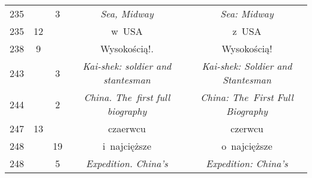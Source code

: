 \documentclass[a4paper,11pt]{article}
\numberwithin{equation}{section}
\begin{document}
\begin{center}
\begin{tabular}{|c|c|c|c|c|}
    235 & &  3 & \textit{Sea, Midway} & \textit{Sea: Midway} \\
    235 & 12 & & w~USA & z~USA \\
    238 &  9 & & Wysokością!. & Wysokością! \\
    243 & &  3 & \textit{Kai-shek: soldier and stantesman}
           & \textit{Kai-shek: Soldier and Stantesman} \\
    244 & &  2 & \textit{China. The~first full biography}
           & \textit{China: The~First Full Biography} \\
    247 & 13 & & czaerwcu & czerwcu \\
    248 & & 19 & i~najcięższe & o~najcięższe \\
    248 & &  5 & \textit{Expedition. China's}
           & \textit{Expedition: China's} \\
    \hline
  \end{tabular}





  \newpage


\end{center}
\end{document}
